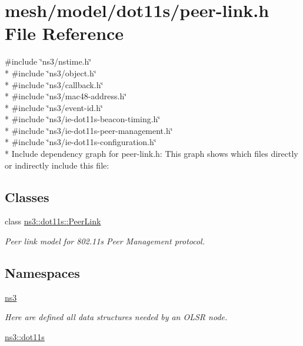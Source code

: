 \hypertarget{peer-link_8h}{}\section{mesh/model/dot11s/peer-\/link.h File Reference}
\label{peer-link_8h}
{\ttfamily \#include \char`\"{}ns3/nstime.\+h\char`\"{}}\\*
{\ttfamily \#include \char`\"{}ns3/object.\+h\char`\"{}}\\*
{\ttfamily \#include \char`\"{}ns3/callback.\+h\char`\"{}}\\*
{\ttfamily \#include \char`\"{}ns3/mac48-\/address.\+h\char`\"{}}\\*
{\ttfamily \#include \char`\"{}ns3/event-\/id.\+h\char`\"{}}\\*
{\ttfamily \#include \char`\"{}ns3/ie-\/dot11s-\/beacon-\/timing.\+h\char`\"{}}\\*
{\ttfamily \#include \char`\"{}ns3/ie-\/dot11s-\/peer-\/management.\+h\char`\"{}}\\*
{\ttfamily \#include \char`\"{}ns3/ie-\/dot11s-\/configuration.\+h\char`\"{}}\\*
Include dependency graph for peer-\/link.h\+:
This graph shows which files directly or indirectly include this file\+:
\subsection*{Classes}
\begin{DoxyCompactItemize}
\item 
class \hyperlink{classns3_1_1dot11s_1_1PeerLink}{ns3\+::dot11s\+::\+Peer\+Link}
\begin{DoxyCompactList}\small\item\em Peer link model for 802.\+11s Peer Management protocol. \end{DoxyCompactList}\end{DoxyCompactItemize}
\subsection*{Namespaces}
\begin{DoxyCompactItemize}
\item 
 \hyperlink{namespacens3}{ns3}
\begin{DoxyCompactList}\small\item\em Here are defined all data structures needed by an O\+L\+SR node. \end{DoxyCompactList}\item 
 \hyperlink{namespacens3_1_1dot11s}{ns3\+::dot11s}
\end{DoxyCompactItemize}
